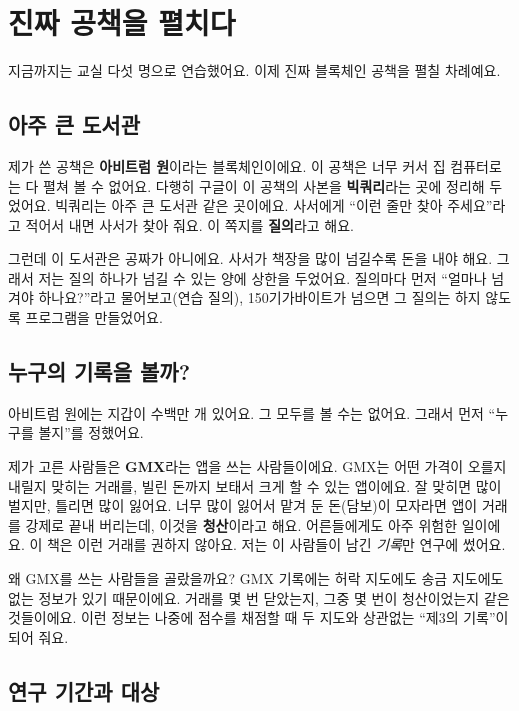 \chapter{진짜 공책을 펼치다}

지금까지는 교실 다섯 명으로 연습했어요.
이제 진짜 블록체인 공책을 펼칠 차례예요.

\section{아주 큰 도서관}

제가 쓴 공책은 \textbf{아비트럼 원}이라는 블록체인이에요.
이 공책은 너무 커서 집 컴퓨터로는 다 펼쳐 볼 수 없어요.
다행히 구글이 이 공책의 사본을 \textbf{빅쿼리}라는 곳에 정리해 두었어요.
빅쿼리는 아주 큰 도서관 같은 곳이에요.
사서에게 “이런 줄만 찾아 주세요”라고 적어서 내면 사서가 찾아 줘요.
이 쪽지를 \textbf{질의}라고 해요.

그런데 이 도서관은 공짜가 아니에요.
사서가 책장을 많이 넘길수록 돈을 내야 해요.
그래서 저는 질의 하나가 넘길 수 있는 양에 상한을 두었어요.
질의마다 먼저 “얼마나 넘겨야 하나요?”라고 물어보고(연습 질의),
150기가바이트가 넘으면 그 질의는 하지 않도록 프로그램을 만들었어요.

\section{누구의 기록을 볼까?}

아비트럼 원에는 지갑이 수백만 개 있어요.
그 모두를 볼 수는 없어요.
그래서 먼저 “누구를 볼지”를 정했어요.

제가 고른 사람들은 \textbf{GMX}라는 앱을 쓰는 사람들이에요.
GMX는 어떤 가격이 오를지 내릴지 맞히는 거래를, 빌린 돈까지 보태서 크게 할 수 있는 앱이에요.
잘 맞히면 많이 벌지만, 틀리면 많이 잃어요.
너무 많이 잃어서 맡겨 둔 돈(담보)이 모자라면 앱이 거래를 강제로 끝내 버리는데, 이것을 \textbf{청산}이라고 해요.
어른들에게도 아주 위험한 일이에요.
이 책은 이런 거래를 권하지 않아요.
저는 이 사람들이 남긴 \emph{기록}만 연구에 썼어요.

왜 GMX를 쓰는 사람들을 골랐을까요?
GMX 기록에는 허락 지도에도 송금 지도에도 없는 정보가 있기 때문이에요.
거래를 몇 번 닫았는지, 그중 몇 번이 청산이었는지 같은 것들이에요.
이런 정보는 나중에 점수를 채점할 때 두 지도와 상관없는 “제3의 기록”이 되어 줘요.

\section{연구 기간과 대상}

